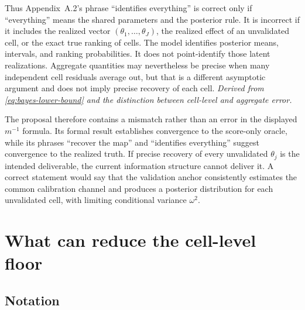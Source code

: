 \documentclass[11pt]{article}
\begin{document}
Thus Appendix~A.2's phrase ``identifies everything'' is correct only if
``everything'' means the shared parameters and the posterior rule. It is
incorrect if it includes the realized vector
\((\theta_1,\ldots,\theta_J)\), the realized effect of an unvalidated cell,
or the exact true ranking of cells. The model identifies posterior means,
intervals, and ranking probabilities. It does not point-identify those
latent realizations. Aggregate quantities may nevertheless be precise when
many independent cell residuals average out, but that is a different
asymptotic argument and does not imply precise recovery of each cell.
\emph{Derived from \eqref{eq:bayes-lower-bound} and the distinction between
cell-level and aggregate error.}

The proposal therefore contains a mismatch rather than an error in the
displayed \(m^{-1}\) formula. Its formal result establishes convergence to
the score-only oracle, while its phrases ``recover the map'' and ``identifies
everything'' suggest convergence to the realized truth. If precise recovery
of every unvalidated \(\theta_j\) is the intended deliverable, the current
information structure cannot deliver it. A correct statement would say that
the validation anchor consistently estimates the common calibration channel
and produces a posterior distribution for each unvalidated cell, with
limiting conditional variance \(\omega^2\).

\section{What can reduce the cell-level floor}

\subsection*{Notation}
\end{document}
